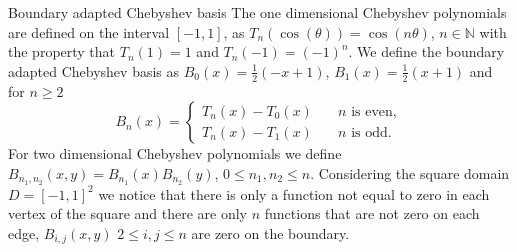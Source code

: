 \documentclass{beamer}
\newcommand{\numberset}{\mathbb}
\newcommand{\N}{\numberset{N}}
\begin{document}
\begin{frame}{Boundary adapted Chebyshev basis}
	The one dimensional Chebyshev polynomials are defined on the interval $ [-1, 1] $, as $T_n(\cos(\theta)) = \cos(n\theta)$, $n \in \N$ with the property that $T_n(1) = 1$ and $T_n(-1) = (-1)^n$. We define the boundary adapted Chebyshev basis as $B_0(x) = \frac12(-x+1)$, $B_1(x) = \frac12(x+1)$ and for $n \ge 2$
	\[ B_n(x) = \begin{cases}
		T_n(x) - T_0(x) \quad & n \text{ is even},\\
		T_n(x) - T_1(x) \quad & n \text{ is odd}.
	\end{cases} \]	
	\pause
	For two dimensional Chebyshev polynomials we define $B_{n_1, n_2}(x, y) = B_{n_1}(x)B_{n_2}(y)$, $ 0 \le n_1, n_2 \le n$. Considering the square domain $D = [-1, 1]^2$ we notice that there is only a function not equal to zero in each vertex of the square and there are only $n$ functions that are not zero on each edge, $B_{i,j}(x,y) $ $ 2\le i,j \le n$ are zero on the boundary.
\end{frame}

\end{document}
